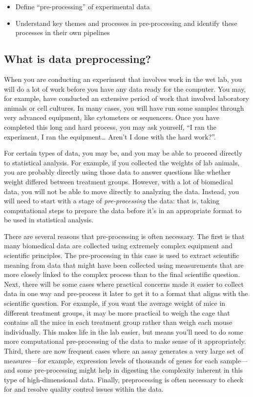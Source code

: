 \documentclass[]{tufte-book}
\providecommand{\tightlist}{%
  \setlength{\itemsep}{0pt}\setlength{\parskip}{0pt}}
\begin{document}
\begin{itemize}
\tightlist
\item
  Define ``pre-processing'' of experimental data
\item
  Understand key themes and processes in pre-processing and identify these
  processes in their own pipelines
\end{itemize}

\subsection{What is data preprocessing?}\label{what-is-data-preprocessing}

When you are conducting an experiment that involves work in the wet lab, you
will do a lot of work before you have any data ready for the computer. You may,
for example, have conducted an extensive period of work that involved laboratory
animals or cell cultures. In many cases, you will have run some samples through
very advanced equipment, like cytometers or sequencers. Once you have completed
this long and hard process, you may ask yourself, ``I ran the experiment, I ran
the equipment\ldots{} Aren't I done with the hard work?''.

For certain types of data, you may be, and you may be able to proceed directly to
statistical analysis. For example, if you collected the weights of lab animals,
you are probably directly using those data to answer questions like whether weight
differed between treatment groups. However, with a lot of biomedical data, you
will not be able to move directly to analyzing the data. Instead, you will need
to start with a stage of \emph{pre-processing} the data: that is, taking
computational steps to prepare the data before it's in an appropriate format to
be used in statistical analysis.

There are several reasons that pre-processing is often necessary. The first is
that many biomedical data are collected using extremely complex equipment and
scientific principles. The pre-processing in this case is used to extract scientific
meaning from data that might have been collected using measurements that are
more closely linked to the complex process than to the final scientific question.
Next, there will be some cases where practical concerns made it easier to
collect data in one way and pre-process it later to get it to a format that
aligns with the scientific question. For example, if you want the average weight
of mice in different treatment groups, it may be more practical to weigh the
cage that contains all the mice in each treatment group rather than weigh
each mouse individually. This makes life in the lab easier, but means you'll need
to do some more computational pre-processing of the data to make sense of it
appropriately. Third, there are now frequent cases where an assay generates
a very large set of measures---for example, expression levels of thousands of
genes for each sample---and some pre-processing might help in digesting the
complexity inherent in this type of high-dimensional data. Finally, preprocessing
is often necessary to check for and resolve quality control issues within the
data.
\end{document}
